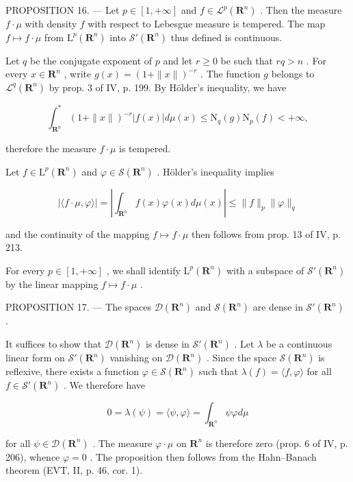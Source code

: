 PROPOSITION 16. --- Let \(p \in [1, +\infty]\) and \(f \in \mathcal{L}^{p}(\mathbf{R}^{n})\) . Then the measure \(f \cdot \mu\) with density \(f\) with respect to Lebesgue measure is tempered. The map \(f \mapsto f \cdot \mu\) from \(\mathrm{L}^{p}(\mathbf{R}^{n})\) into \(\mathcal{S}'(\mathbf{R}^{n})\) thus defined is continuous.

Let \(q\) be the conjugate exponent of \(p\) and let \(r \geqslant 0\) be such that \(rq > n\) . For every \(x \in \mathbf{R}^n\) , write \(g(x) = (1 + \|x\|)^{-r}\) . The function \(g\) belongs to \(\mathcal{L}^q(\mathbf{R}^n)\) by prop. 3 of IV, p. 199. By Hölder's inequality, we have

\[
\int_ {\mathbf {R} ^ {n}} ^ {*} (1 + \| x \|) ^ {- r} | f (x) | d \mu (x) \leqslant \mathrm{N} _ {q} (g) \mathrm{N} _ {p} (f) <   + \infty ,
\]

therefore the measure \(f \cdot \mu\) is tempered.

Let \(f \in \mathrm{L}^p(\mathbf{R}^n)\) and \(\varphi \in \mathcal{S}(\mathbf{R}^n)\) . Hölder's inequality implies

\[
| \langle f \cdot \mu , \varphi \rangle | = \left| \int_ {\mathbf {R} ^ {n}} f (x) \varphi (x) d \mu (x) \right| \leqslant \| f \| _ {p} \| \varphi \| _ {q}
\]

and the continuity of the mapping \(f \mapsto f \cdot \mu\) then follows from prop. 13 of IV, p. 213.

For every \(p \in [1, +\infty]\) , we shall identify \(\mathrm{L}^p(\mathbf{R}^n)\) with a subspace of \(\mathcal{S}'(\mathbf{R}^n)\) by the linear mapping \(f \mapsto f \cdot \mu\) .

PROPOSITION 17. --- The spaces \(\mathcal{D}(\mathbf{R}^{n})\) and \(\mathcal{S}(\mathbf{R}^{n})\) are dense in \(\mathcal{S}'(\mathbf{R}^{n})\) .

It suffices to show that \(\mathcal{D}(\mathbf{R}^{n})\) is dense in \(\mathcal{S}'(\mathbf{R}^{n})\) . Let \(\lambda\) be a continuous linear form on \(\mathcal{S}'(\mathbf{R}^{n})\) vanishing on \(\mathcal{D}(\mathbf{R}^{n})\) . Since the space \(\mathcal{S}(\mathbf{R}^{n})\) is reflexive, there exists a function \(\varphi \in \mathcal{S}(\mathbf{R}^{n})\) such that \(\lambda(f) = \langle f, \varphi \rangle\) for all \(f \in \mathcal{S}'(\mathbf{R}^{n})\) . We therefore have

\[
0 = \lambda (\psi) = \langle \psi , \varphi \rangle = \int_ {\mathbf {R} ^ {n}} \psi \varphi d \mu
\]

for all \(\psi\in\mathcal{D}(\mathbf{R}^{n})\) . The measure \(\varphi\cdot\mu\) on \(\mathbf{R}^{n}\) is therefore zero (prop. 6 of IV, p. 206), whence \(\varphi=0\) . The proposition then follows from the Hahn–Banach theorem (EVT, II, p. 46, cor. 1).

